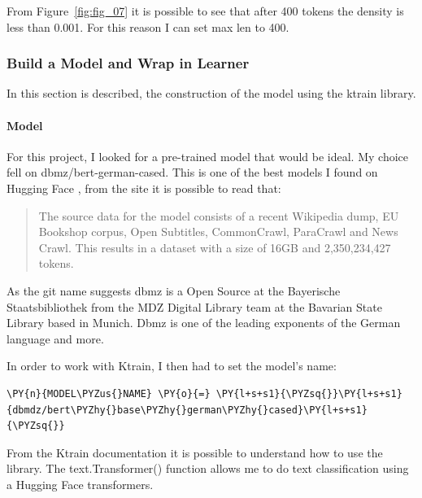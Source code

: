 From Figure~\ref{fig:fig_07} it is possible to see that after 400 tokens the density is less than 0.001. For this reason I can set max len to 400.

\subsubsection{Build a Model and Wrap in Learner}
\label{chap:ktrain build a model}
In this section is described, the construction of the model using the ktrain library.

\paragraph{Model}
For this project, I looked for a pre-trained model that would be ideal. My choice fell on dbmz/bert-german-cased.
This is one of the best models I found on Hugging Face \cite{noauthor_dbmdzbert-base-german-uncased_nodate}, from the site it is possible to read that:
\begin{quote}
    The source data for the model consists of a recent Wikipedia dump, EU Bookshop corpus, Open Subtitles, CommonCrawl, ParaCrawl and News Crawl. This results in a dataset with a size of 16GB and 2,350,234,427 tokens.
\end{quote}

As the git name suggests dbmz \cite{noauthor_open_nodate} is a Open Source at the Bayerische Staatsbibliothek from the MDZ Digital Library team at the Bavarian State Library \cite{noauthor_munich_nodate} based in Munich. Dbmz is one of the leading exponents of the German language and more.

In order to work with Ktrain, I then had to set the model's name:

 \begin{tcolorbox}[breakable, size=fbox, boxrule=1pt, pad at break*=1mm,colback=cellbackground, colframe=cellborder]
\begin{Verbatim}[commandchars=\\\{\},fontsize=\footnotesize]
\PY{n}{MODEL\PYZus{}NAME} \PY{o}{=} \PY{l+s+s1}{\PYZsq{}}\PY{l+s+s1}{dbmdz/bert\PYZhy{}base\PYZhy{}german\PYZhy{}cased}\PY{l+s+s1}{\PYZsq{}}
\end{Verbatim}
\end{tcolorbox}

From the Ktrain documentation it is possible to understand how to use the library.
The text.Transformer() function allows me to do text classification using a Hugging Face transformers.

